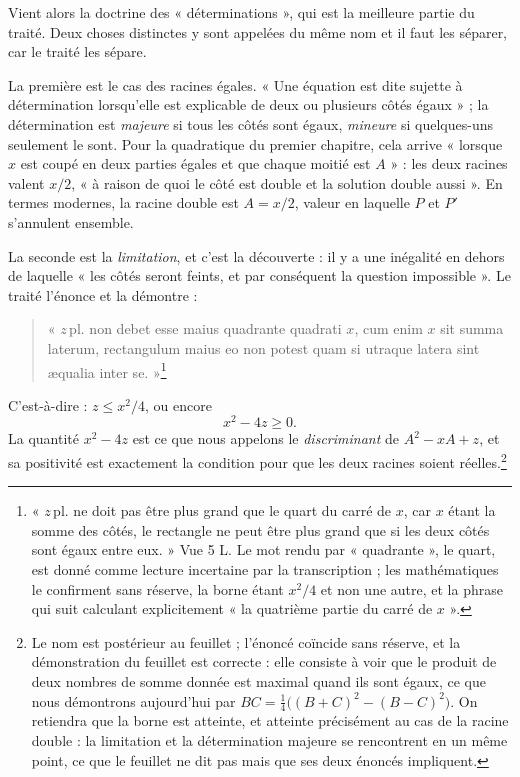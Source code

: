\documentclass[11pt,a4paper]{article}
\begin{document}
Vient alors la doctrine des « déterminations », qui est la meilleure partie du
traité. Deux choses distinctes y sont appelées du même nom et il faut les
séparer, car le traité les sépare.

La première est le cas des racines égales. « Une équation est dite sujette à
détermination lorsqu'elle est explicable de deux ou plusieurs côtés égaux » ; la
détermination est \emph{majeure} si tous les côtés sont égaux, \emph{mineure} si
quelques-uns seulement le sont. Pour la quadratique du premier chapitre, cela
arrive « lorsque $x$ est coupé en deux parties égales et que chaque moitié est
$A$ » : les deux racines valent $x/2$, « à raison de quoi le côté est double et
la solution double aussi ». En termes modernes, la racine double est
$A = x/2$, valeur en laquelle $P$ et $P'$ s'annulent ensemble.

La seconde est la \emph{limitation}, et c'est la découverte : il y a une
inégalité en dehors de laquelle « les côtés seront feints, et par conséquent la
question impossible ». Le traité l'énonce et la démontre :

\begin{quote}
« $z\,\mathrm{pl.}$ non debet esse maius quadrante quadrati $x$, cum enim $x$ sit
summa laterum, rectangulum maius eo non potest quam si utraque latera sint
æqualia inter se. »\footnote{« $z\,\mathrm{pl.}$ ne doit pas être plus grand que
le quart du carré de $x$, car $x$ étant la somme des côtés, le rectangle ne peut
être plus grand que si les deux côtés sont égaux entre eux. » Vue 5 L. Le mot
rendu par « quadrante », le quart, est donné comme lecture incertaine par la
transcription ; les mathématiques le confirment sans réserve, la borne étant
$x^2/4$ et non une autre, et la phrase qui suit calculant explicitement « la
quatrième partie du carré de $x$ ».}
\end{quote}

C'est-à-dire : $z \le x^2/4$, ou encore
\[ x^2 - 4z \ge 0. \]
La quantité $x^2 - 4z$ est ce que nous appelons le \emph{discriminant} de
$A^2 - xA + z$, et sa positivité est exactement la condition pour que les deux
racines soient réelles.\footnote{Le nom est postérieur au feuillet ; l'énoncé
coïncide sans réserve, et la démonstration du feuillet est correcte : elle
consiste à voir que le produit de deux nombres de somme donnée est maximal
quand ils sont égaux, ce que nous démontrons aujourd'hui par
$BC = \tfrac14\bigl((B+C)^2 - (B-C)^2\bigr)$. On retiendra que la borne est
atteinte, et atteinte précisément au cas de la racine double : la limitation et
la détermination majeure se rencontrent en un même point, ce que le feuillet ne
dit pas mais que ses deux énoncés impliquent.}
\end{document}
